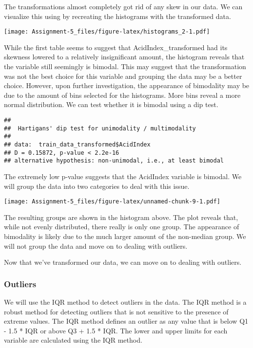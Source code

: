\documentclass[
]{article}
\begin{document}
The transformations almost completely got rid of any skew in our data.
We can visualize this using by recreating the histograms with the
transformed data.

\texttt{[image: Assignment-5\_files/figure-latex/histograms\_2-1.pdf]}

While the first table seems to suggest that AcidIndex\_transformed had
its skewness lowered to a relatively insignificant amount, the histogram
reveals that the variable still seemingly is bimodal. This may suggest
that the transformation was not the best choice for this variable and
grouping the data may be a better choice. However, upon further
investigation, the appearance of bimodality may be due to the amount of
bins selected for the histograms. More bins reveal a more normal
distribution. We can test whether it is bimodal using a dip test.

\begin{verbatim}
## 
##  Hartigans' dip test for unimodality / multimodality
## 
## data:  train_data_transformed$AcidIndex
## D = 0.15872, p-value < 2.2e-16
## alternative hypothesis: non-unimodal, i.e., at least bimodal
\end{verbatim}

The extremely low p-value suggests that the AcidIndex variable is
bimodal. We will group the data into two categories to deal with this
issue.

\texttt{[image: Assignment-5\_files/figure-latex/unnamed-chunk-9-1.pdf]}

The resulting groups are shown in the histogram above. The plot reveals
that, while not evenly distributed, there really is only one group. The
appearance of bimodality is likely due to the much larger amount of the
non-median group. We will not group the data and move on to dealing with
outliers.

Now that we've transformed our data, we can move on to dealing with
outliers.

\subsubsection{Outliers}\label{outliers}

We will use the IQR method to detect outliers in the data. The IQR
method is a robust method for detecting outliers that is not sensitive
to the presence of extreme values. The IQR method defines an outlier as
any value that is below Q1 - 1.5 * IQR or above Q3 + 1.5 * IQR. The
lower and upper limits for each variable are calculated using the IQR
method.
\end{document}
